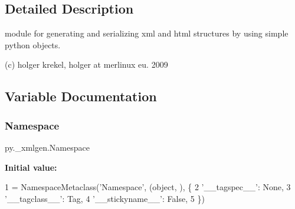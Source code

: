 \subsection{Detailed Description}
\begin{DoxyVerb}module for generating and serializing xml and html structures
by using simple python objects.

(c) holger krekel, holger at merlinux eu. 2009
\end{DoxyVerb}
 

\subsection{Variable Documentation}
\mbox{\label{namespacepy_1_1__xmlgen_ab204637a5e6f4d88fd05aa10cecebb39}} 
\subsubsection{\texorpdfstring{Namespace}{Namespace}}
{\footnotesize\ttfamily py.\+\_\+xmlgen.\+Namespace}

{\bfseries Initial value\+:}
\begin{DoxyCode}
1 =  NamespaceMetaclass(\textcolor{stringliteral}{'Namespace'}, (object, ), \{
2     \textcolor{stringliteral}{'\_\_tagspec\_\_'}: \textcolor{keywordtype}{None},
3     \textcolor{stringliteral}{'\_\_tagclass\_\_'}: Tag,
4     \textcolor{stringliteral}{'\_\_stickyname\_\_'}: \textcolor{keyword}{False},
5 \})
\end{DoxyCode}
